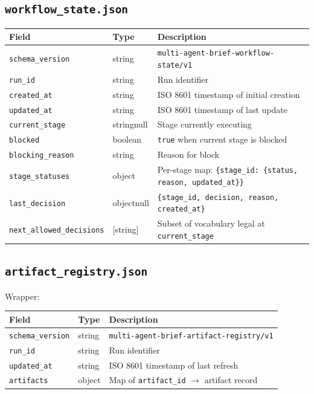 \documentclass[11pt,a4paper]{article}
\begin{document}
\subsection{\texttt{workflow\_state.json}}

\begin{table}[ht]
\centering
\footnotesize
\begin{tabular}{@{}lll@{}}
\toprule
\textbf{Field} & \textbf{Type} & \textbf{Description} \\
\midrule
\texttt{schema\_version} & string & \texttt{multi-agent-brief-workflow-state/v1} \\
\texttt{run\_id} & string & Run identifier \\
\texttt{created\_at} & string & ISO 8601 timestamp of initial creation \\
\texttt{updated\_at} & string & ISO 8601 timestamp of last update \\
\texttt{current\_stage} & string\textbar{}null & Stage currently executing \\
\texttt{blocked} & boolean & \texttt{true} when current stage is blocked \\
\texttt{blocking\_reason} & string & Reason for block \\
\texttt{stage\_statuses} & object & Per-stage map: \texttt{\{stage\_id: \{status, reason, updated\_at\}\}} \\
\texttt{last\_decision} & object\textbar{}null & \texttt{\{stage\_id, decision, reason, created\_at\}} \\
\texttt{next\_allowed\_decisions} & [string] & Subset of vocabulary legal at \texttt{current\_stage} \\
\bottomrule
\end{tabular}
\end{table}

\subsection{\texttt{artifact\_registry.json}}

Wrapper:
\begin{table}[ht]
\centering
\begin{tabular}{@{}lll@{}}
\toprule
\textbf{Field} & \textbf{Type} & \textbf{Description} \\
\midrule
\texttt{schema\_version} & string & \texttt{multi-agent-brief-artifact-registry/v1} \\
\texttt{run\_id} & string & Run identifier \\
\texttt{updated\_at} & string & ISO 8601 timestamp of last refresh \\
\texttt{artifacts} & object & Map of \texttt{artifact\_id} $\rightarrow$ artifact record \\
\bottomrule
\end{tabular}
\end{table}
\end{document}
